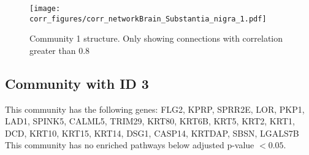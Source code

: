 \begin{figure}[h!]
\centering
\texttt{[image: corr\_figures/corr\_networkBrain\_Substantia\_nigra\_1.pdf]}
\caption{Community 1 structure. Only showing connections with correlation greater than 0.8}
\end{figure}




\subsection*{Community with ID 3}
This community has the following genes: FLG2, KPRP, SPRR2E, LOR, PKP1, LAD1, SPINK5, CALML5, TRIM29, KRT80, KRT6B, KRT5, KRT2, KRT1, DCD, KRT10, KRT15, KRT14, DSG1, CASP14, KRTDAP, SBSN, LGALS7B
\\
This community has no enriched pathways below adjusted p-value $< 0.05$.

